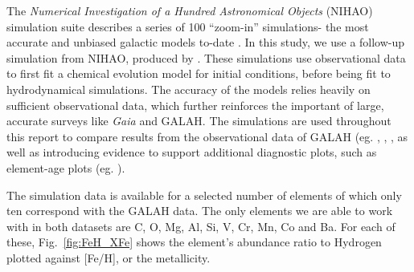 \documentclass[fleqn,usenatbib]{mnras}
\newcommand{\Gaia}{\textit{Gaia}\xspace} %
\begin{document}
The \textit{Numerical Investigation of a Hundred Astronomical Objects} (NIHAO) simulation suite describes a series of 100 “zoom-in” simulations- the most accurate and unbiased galactic models to-date \citep{Wang2015}. In this study, we use a follow-up simulation from NIHAO, produced by \citet{Buck2021}. These simulations use observational data to first fit a chemical evolution model for initial conditions, before being fit to hydrodynamical simulations. The accuracy of the models relies heavily on sufficient observational data, which further reinforces the important of large, accurate surveys like \Gaia and GALAH. The simulations are used throughout this report to compare results from the observational data of GALAH (eg. \citep{Buder2022}, \citep{Hawkins2015}, \citep{Das2020}, as well as introducing evidence to support additional diagnostic plots, such as element-age plots (eg. \citep{Martig2021}).
\par 
The simulation data is available for a selected number of elements of which only ten correspond with the GALAH data. The only elements we are able to work with in both datasets are C, O, Mg, Al, Si, V, Cr, Mn, Co and Ba. For each of these, Fig.~\ref{fig:FeH_XFe} shows the element’s abundance ratio to Hydrogen plotted against [Fe/H], or the metallicity. 

\end{document}
